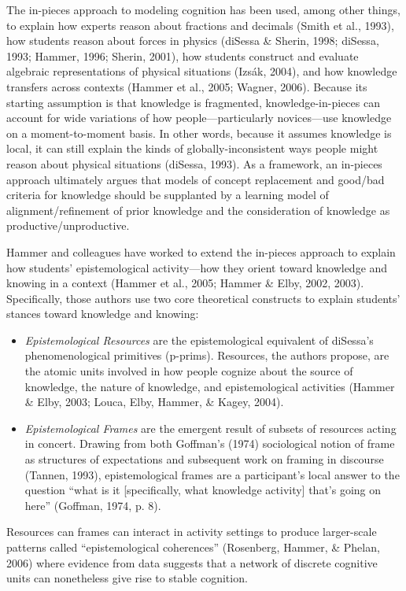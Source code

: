 The in-pieces approach to modeling cognition has been used, among other
things, to explain how experts reason about fractions and decimals
(Smith et al., 1993), how students reason about forces in physics
(diSessa \& Sherin, 1998; diSessa, 1993; Hammer, 1996; Sherin, 2001),
how students construct and evaluate algebraic representations of
physical situations (Izsák, 2004), and how knowledge transfers across
contexts (Hammer et al., 2005; Wagner, 2006). Because its starting
assumption is that knowledge is fragmented, knowledge-in-pieces can
account for wide variations of how people---particularly novices---use
knowledge on a moment-to-moment basis. In other words, because it
assumes knowledge is local, it can still explain the kinds of
globally-inconsistent ways people might reason about physical situations
(diSessa, 1993). As a framework, an in-pieces approach ultimately argues
that models of concept replacement and good/bad criteria for knowledge
should be supplanted by a learning model of alignment/refinement of
prior knowledge and the consideration of knowledge as
productive/unproductive.

Hammer and colleagues have worked to extend the in-pieces approach to
explain how students' epistemological activity---how they orient toward
knowledge and knowing in a context (Hammer et al., 2005; Hammer \& Elby,
2002, 2003). Specifically, those authors use two core theoretical
constructs to explain students' stances toward knowledge and knowing:

\begin{itemize}
\item
  \emph{Epistemological Resources} are the epistemological equivalent of
  diSessa's phenomenological primitives (p-prims). Resources, the
  authors propose, are the atomic units involved in how people cognize
  about the source of knowledge, the nature of knowledge, and
  epistemological activities (Hammer \& Elby, 2003; Louca, Elby, Hammer,
  \& Kagey, 2004).
\item
  \emph{Epistemological Frames} are the emergent result of subsets of
  resources acting in concert. Drawing from both Goffman's (1974)
  sociological notion of frame as structures of expectations and
  subsequent work on framing in discourse (Tannen, 1993),
  epistemological frames are a participant's local answer to the
  question ``what is it {[}specifically, what knowledge activity{]}
  that's going on here'' (Goffman, 1974, p. 8).
\end{itemize}

Resources can frames can interact in activity settings to produce
larger-scale patterns called ``epistemological coherences'' (Rosenberg,
Hammer, \& Phelan, 2006) where evidence from data suggests that a
network of discrete cognitive units can nonetheless give rise to stable
cognition.

